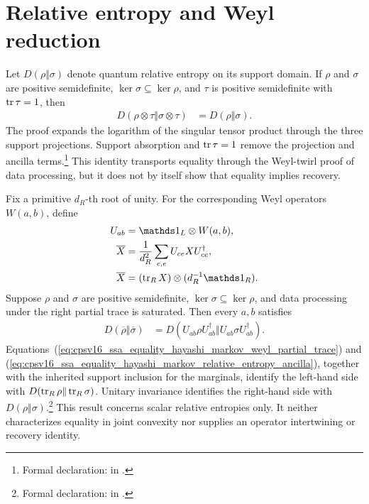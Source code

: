 \documentclass[11pt]{article}
\begin{document}
\section{Relative entropy and Weyl reduction}

Let $D(\rho\Vert\sigma)$ denote quantum relative entropy on its support domain.
If $\rho$ and $\sigma$ are positive semidefinite,
$\ker\sigma\subseteq\ker\rho$, and $\tau$ is positive semidefinite with
$\operatorname{tr}\tau=1$, then
\begin{align}
    D(\rho\otimes\tau\Vert\sigma\otimes\tau)
        &=D(\rho\Vert\sigma).
    \label{eq:cpsv16_ssa_equality_hayashi_markov_relative_entropy_ancilla}
\end{align}
The proof expands the logarithm of the singular tensor product through the
three support projections. Support absorption and $\operatorname{tr}\tau=1$ remove the
projection and ancilla terms.\footnote{Formal declaration:
 in
.}
This identity transports equality through the Weyl-twirl proof of data
processing, but it does not by itself show that equality implies recovery.

Fix a primitive $d_R$-th root of unity. For the corresponding Weyl operators
$W(a,b)$, define
\begin{align}
    U_{ab}
        &=\Id_L\otimes W(a,b),
    \label{eq:cpsv16_ssa_equality_hayashi_markov_weyl_unitary}\\
    \overline X
        &=\frac{1}{d_R^2}\sum_{c,e}U_{ce}XU_{ce}^\dagger,
    \label{eq:cpsv16_ssa_equality_hayashi_markov_weyl_average}\\
    \overline X
        &=(\tr_R X)\otimes(d_R^{-1}\Id_R).
    \label{eq:cpsv16_ssa_equality_hayashi_markov_weyl_partial_trace}
\end{align}
Suppose $\rho$ and $\sigma$ are positive semidefinite,
$\ker\sigma\subseteq\ker\rho$, and data processing under the right partial
trace is saturated. Then every $a,b$ satisfies
\begin{align}
    D(\overline\rho\Vert\overline\sigma)
        &=
        D(U_{ab}\rho U_{ab}^\dagger
            \Vert U_{ab}\sigma U_{ab}^\dagger).
    \label{eq:cpsv16_ssa_equality_hayashi_markov_weyl_summand_equality}
\end{align}
Equations~(\ref{eq:cpsv16_ssa_equality_hayashi_markov_weyl_partial_trace}) and
(\ref{eq:cpsv16_ssa_equality_hayashi_markov_relative_entropy_ancilla}),
together with the inherited support inclusion for the marginals, identify the
left-hand side with $D(\operatorname{tr}_R\rho\Vert\operatorname{tr}_R\sigma)$. Unitary invariance
identifies the right-hand side with $D(\rho\Vert\sigma)$.\footnote{Formal
declaration:
in .}
This result concerns scalar relative entropies only. It neither characterizes
equality in joint convexity nor supplies an operator intertwining or recovery
identity.
\end{document}
